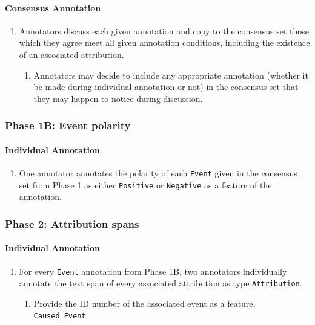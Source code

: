 \documentclass[a4paper,12pt]{article}
\begin{document}
    \paragraph{Consensus Annotation}
        \begin{enumerate}
            \item Annotators discuss each given annotation and copy to the consensus set those which they agree meet all given annotation conditions, including the existence of an associated attribution.
                \begin{enumerate}
                    \item Annotators may decide to include any appropriate annotation (whether it be made during individual annotation or not) in the consensus set that they may happen to notice during discussion.
                \end{enumerate}
        \end{enumerate}


    \subsubsection{Phase 1B: Event polarity}
    \paragraph{Individual Annotation}
        \begin{enumerate}
            \item One annotator annotates the polarity of each \texttt{Event} given in the consensus set from Phase 1 as either \texttt{Positive} or \texttt{Negative} as a feature of the annotation.
        \end{enumerate}

    \subsubsection{Phase 2: Attribution spans}
    \paragraph{Individual Annotation}
        \begin{enumerate}
            \item For every \texttt{Event} annotation from Phase 1B, two annotators individually annotate the text span of every associated attribution as type \texttt{Attribution}.
                \begin{enumerate}
                    \item Provide the ID number of the associated event as a feature, \texttt{Caused\_Event}.
                \end{enumerate}
        \end{enumerate}
\end{document}
